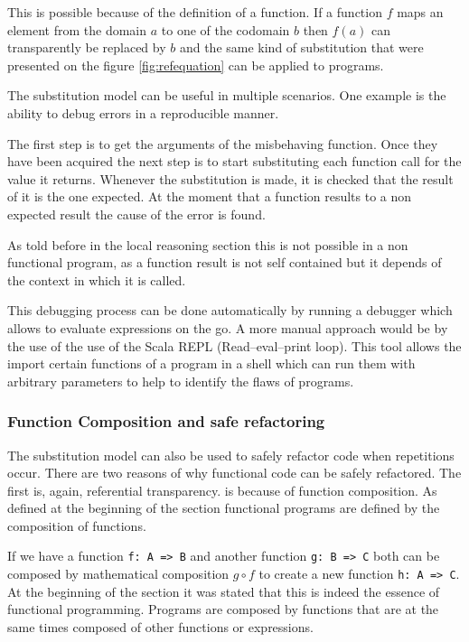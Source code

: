 \documentclass[../main.tex]{subfiles}
\begin{document}
This is possible because of the definition of a function. If a function $f$ maps an
element from the domain $a$ to one of the codomain $b$ then $f(a)$ can
transparently be replaced by $b$ and the same kind of substitution that were
presented on the figure \ref{fig:refequation} can be applied to programs.

The substitution model can be useful in multiple scenarios. One example is the
ability to debug errors in a reproducible manner.

The first step is to get the arguments of the misbehaving function. Once they have been acquired the next step is to
start substituting each function call for the value it returns. Whenever the
substitution is made, it is checked that the result of it is the one expected. At the
moment that a function results to a non expected result the cause of the error
is found.

As told before in the local reasoning section this is not possible in a non
functional program, as a function result is not self contained but it depends of
the context in which it is called.

This debugging process can be done automatically by running a debugger which allows to
evaluate expressions on the go. A more manual approach would be by the use of
the use of the Scala REPL (Read–eval–print loop). This tool allows the import
certain functions of a program in a shell which can run them with arbitrary
parameters to help to identify the flaws of programs.

\subsubsection{Function Composition and safe refactoring}

The substitution model can also be used to safely refactor code when repetitions
occur. There are two reasons of why functional code can be safely
refactored. The first is, again, referential transparency.  is because of function composition. As defined at the beginning of the section functional programs are defined by the composition of functions.

If we have a function \texttt{f: A => B} and another function \texttt{g: B => C}
both can be composed by mathematical composition $g \circ f$ to create a new
function \texttt{h: A => C}. At the beginning of the section it was stated that
this is indeed the essence of functional programming. Programs are composed by
functions that are at the same times composed of other functions or expressions.
\end{document}
